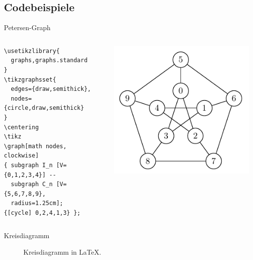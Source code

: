 \documentclass[10pt]{beamer}
\begin{document}
\subsection{Codebeispiele}
\begin{frame}[fragile]{Petersen-Graph}
	\begin{columns}
		\begin{column}{0.5\textwidth}
			\begin{lstlisting}
\usetikzlibrary{
  graphs,graphs.standard
}
\tikzgraphsset{
  edges={draw,semithick}, 
  nodes={circle,draw,semithick}
}
\centering
\tikz 
\graph[math nodes, clockwise]
{ subgraph I_n [V={0,1,2,3,4}] --
  subgraph C_n [V={5,6,7,8,9},
  radius=1.25cm];
{[cycle] 0,2,4,1,3} };
    \end{lstlisting}
		\end{column}
		\begin{column}{0.5\textwidth}  
			\begin{center}
				\includegraphics[width=\textwidth]{graph.pdf}
			\end{center}
		\end{column}
	\end{columns}
\end{frame}

\begin{frame}{Kreisdiagramm}
	\begin{figure}[h]
		\centering
		\togglefalse{showpct}
		\caption{Kreisdiagramm in \LaTeX.}
		\label{fig:chainweb_miner}
	\end{figure}
\end{frame}
\end{document}
